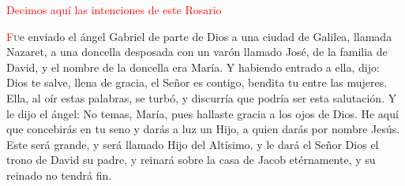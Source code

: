 \documentclass[10pt,twoside]{book}
\begin{document}
\begin{paracol}{2}

      \vspace{0.5em}


      \vspace{0.5em}


      \vspace{0.5em}


      \vspace{0.5em}


      \vspace{0.5em}

\end{paracol}

\vspace{0.5em}

\begin{center}
      \textcolor{red}{Decimos aquí las intenciones de este Rosario}
\end{center}

\vspace{0.5em}

\noindent{}

\vspace{4mm}

\noindent{}
\lettrine[lines=2]{\textcolor{red}{F}}ue enviado el ángel Gabriel de parte de Dios a una ciudad de Galilea, llamada Nazaret, 
a una doncella desposada con un varón llamado José, de la familia de David, y el nombre de la doncella era María. 
Y habiendo entrado a ella, dijo: Dios te salve, llena de gracia, el Señor es contigo, bendita tu entre las mujeres.
Ella, al oír estas palabras, se turbó, y discurría que podría ser esta salutación. Y le dijo el ángel: No temas, María, 
pues hallaste gracia a los ojos de Dios. He aquí que concebirás en tu seno y darás a luz un Hijo, a quien darás por nombre Jesús. 
Este será grande, y será llamado Hijo del Altísimo, y le dará el Señor Dios el trono de David su padre, y reinará sobre la 
casa de Jacob etérnamente, y su reinado no tendrá fin.
\end{document}
